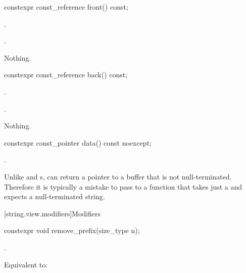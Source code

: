 %
\begin{itemdecl}
constexpr const_reference front() const;
\end{itemdecl}

\begin{itemdescr}
\pnum
\expects
{}.

\pnum
\returns
{}.

\pnum
\throws
Nothing.
\end{itemdescr}

%
\begin{itemdecl}
constexpr const_reference back() const;
\end{itemdecl}

\begin{itemdescr}
\pnum
\expects
{}.

\pnum
\returns
{}.

\pnum
\throws
Nothing.
\end{itemdescr}

%
\begin{itemdecl}
constexpr const_pointer data() const noexcept;
\end{itemdecl}

\begin{itemdescr}
\pnum
\returns
{}.

\pnum
\begin{note}
Unlike  and s,
 can return a pointer to a buffer that is not null-terminated.
Therefore it is typically a mistake to pass  to a function that takes just a  and expects a null-terminated string.
\end{note}
\end{itemdescr}

[string.view.modifiers]{Modifiers}

%
\begin{itemdecl}
constexpr void remove_prefix(size_type n);
\end{itemdecl}

\begin{itemdescr}
\pnum
\expects
{}.

\pnum
\effects
Equivalent to: 
\end{itemdescr}

